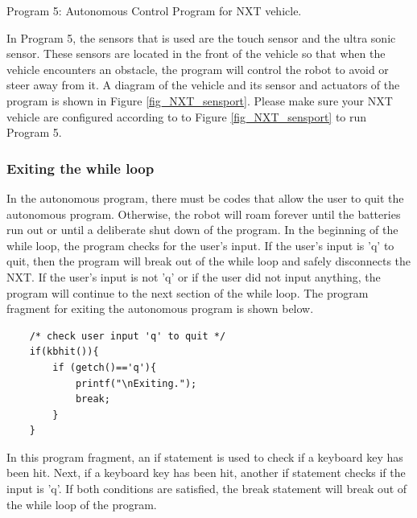 
\begin{center}
Program 5: Autonomous Control Program for NXT vehicle.
\end{center}
In Program 5, the sensors that is used are the touch sensor and the ultra sonic sensor.
These sensors are located in the front of the vehicle so that when the vehicle encounters an obstacle, the program will
    control the robot to avoid or steer away from it.
A diagram of the vehicle and its sensor and actuators of the program is shown in Figure \ref{fig_NXT_sensport}.
Please make sure your NXT vehicle are configured according to to Figure \ref{fig_NXT_sensport} to run Program 5.

\subsubsection*{Exiting the while loop}
In the autonomous program, there must be codes that allow the user to quit the autonomous program.
Otherwise, the robot will roam forever until the batteries run out or until a deliberate shut down of the program.
In the beginning of the while loop, the program checks for the user's input. 
If the user's input is 'q' to quit, then the program will break out of the while loop and safely disconnects the NXT.
If the user's input is not 'q' or if the user did not input anything, the program will continue to the next section of
    the while loop.
The program fragment for exiting the autonomous program is shown below.
\begin{verbatim}
    /* check user input 'q' to quit */
    if(kbhit()){
        if (getch()=='q'){	
            printf("\nExiting.");
            break;
        }
    }
\end{verbatim}
In this program fragment, an if statement is used to check if a keyboard key has been hit.
Next, if a keyboard key has been hit, another if statement checks if the input is 'q'.
If both conditions are satisfied, the break statement will break out of the while loop of the program.

